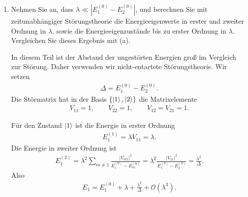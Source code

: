 \documentclass[11pt,a4paper]{scrartcl}
\newcommand{\abs}[1]{\left| #1 \right|}
\begin{document}
\begin{enumerate}[label=(\alph*)]
        \item Nehmen Sie an, dass $\lambda \ll \abs{E_1^{(0)}-E_2^{(0)}}$, und berechnen Sie mit zeitunabhängiger Störungstheorie die Energieeigenwerte in erster und zweiter Ordnung in $\lambda$, sowie die Energieeigenzustände bis zu erster Ordnung in $\lambda$. Vergleichen Sie dieses Ergebnis mit (a).

        \begin{calculationbox}
            \begin{solutionbox}
                In diesem Teil ist der Abstand der ungestörten Energien groß im Vergleich zur Störung. Daher verwenden wir nicht-entartete Störungstheorie. Wir setzen
                \begin{align*}
                    \Delta = E_1^{(0)}-E_2^{(0)}.
                \end{align*}
                Die Störmatrix hat in der Basis $\{\ket{1},\ket{2}\}$ die Matrixelemente
                \begin{align*}
                    V_{11}=1,
                    \qquad
                    V_{22}=1,
                    \qquad
                    V_{12}=V_{21}=1.
                \end{align*}
            \end{solutionbox}

            \begin{calculationbox}[title=Energie von Zustand $\ket{1}$]
                Für den Zustand $\ket{1}$ ist die Energie in erster Ordnung
                \begin{align*}
                    E_1^{(1)}
                    =
                    \lambda V_{11}
                    =
                    \lambda.
                \end{align*}
                Die Energie in zweiter Ordnung ist
                \begin{align*}
                    E_1^{(2)}
                    =
                    \lambda^2
                    \sum_{m\neq 1}
                    \frac{\abs{V_{m1}}^2}{E_1^{(0)}-E_m^{(0)}}
                    =
                    \lambda^2
                    \frac{\abs{V_{21}}^2}{E_1^{(0)}-E_2^{(0)}}
                    =
                    \frac{\lambda^2}{\Delta}.
                \end{align*}
                Also
                \begin{align*}
                    \boxed{
                    E_1
                    =
                    E_1^{(0)}+\lambda+\frac{\lambda^2}{\Delta}
                    +\mathcal O(\lambda^3)}.
                \end{align*}
            \end{calculationbox}


\end{calculationbox}
\end{enumerate}
\end{document}
